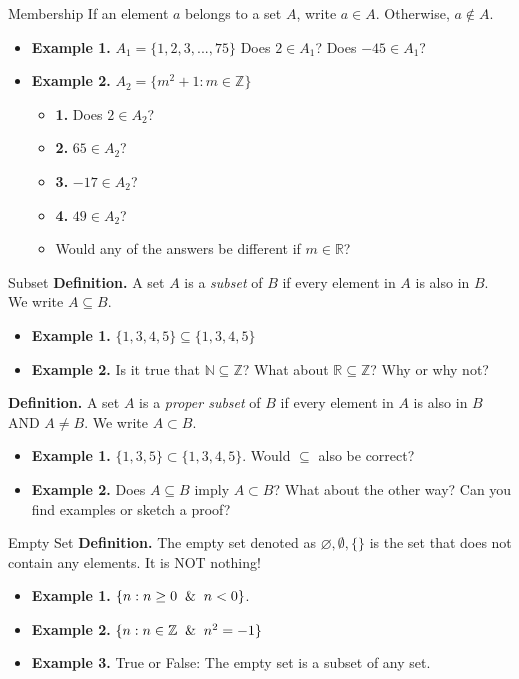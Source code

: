\documentclass[10pt]{beamer}
\begin{document}
\begin{frame}{Membership}
    If an element $a$ belongs to a set $A$, write $a \in A$. Otherwise, $a \notin A$.
    \begin{itemize}
        \item \textbf{Example 1.} $A_1 = \{1,2,3,...,75 \}$ Does $2 \in A_1$? Does $-45 \in A_1$?
        \item \textbf{Example 2.} $A_2 = \{m^2 + 1: m \in \mathbb{Z}  \}$
              \begin{itemize}
                  \item \textbf{1.} Does $2 \in A_2$?
                  \item \textbf{2.} $65 \in A_2$?
                  \item \textbf{3.} $-17 \in A_2$?
                  \item \textbf{4.} $49 \in A_2$?
                  \item Would any of the answers be different if $m \in \mathbb{R}$?
              \end{itemize}
    \end{itemize}
\end{frame}

\begin{frame}{Subset}
    \textbf{Definition.} A set $A$ is a \textit{subset} of $B$ if every element in $A$ is also in $B$. We write $A \subseteq B$.
    \begin{itemize}
        \item \textbf{Example 1.} $\{1,3,4,5\} \subseteq \{1,3,4,5\}$
        \item \textbf{Example 2.} Is it true that $\mathbb{N} \subseteq \mathbb{Z}$? What about $\mathbb{R} \subseteq \mathbb{Z}$? Why or why not?
    \end{itemize}

    \textbf{Definition.} A set $A$ is a \textit{proper subset} of $B$ if every element in $A$ is also in $B$ AND $A \neq B$. We write $A \subset B$.
    \begin{itemize}
        \item \textbf{Example 1.} $\{1,3,5\} \subset \{1,3,4,5\}$. Would $\subseteq$ also be correct?
        \item \textbf{Example 2.} Does $A \subseteq B$ imply $A \subset B$? What about the other way? Can you find examples or sketch a proof?
    \end{itemize}
\end{frame}

\begin{frame}{Empty Set}
    \textbf{Definition.} The empty set denoted as $\varnothing, \emptyset, \{\}$ is the set that does not contain any elements. It is NOT nothing!\\
    \begin{itemize}
        \item \textbf{Example 1.} $\{n:n\geq 0 \And n < 0\}$.
        \item \textbf{Example 2.} $\{n:n \in \mathbb{Z} \And n^2 = -1 \}$
        \item \textbf{Example 3.} True or False: The empty set is a subset of any set.
    \end{itemize}
\end{frame}
\end{document}
